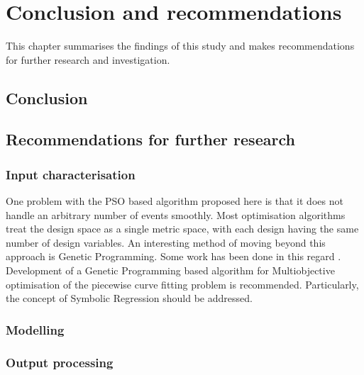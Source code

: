 \chapter{Conclusion and recommendations}\label{chap:conclusion}
\begin{overview}
  This chapter summarises the findings of this study and makes
  recommendations for further research and investigation.
\end{overview}

\section{Conclusion}

\section{Recommendations for further research}
\label{sec:furtherresearch}
\subsection{Input characterisation}
One problem with the PSO based algorithm proposed here is that it does not handle an arbitrary number of events smoothly.  Most optimisation algorithms treat the design space as a single metric space, with each design having the same number of design variables.  An interesting method of moving beyond this approach is Genetic Programming.  Some work has been done in this regard \citehere.  Development of a Genetic Programming based algorithm for Multiobjective optimisation of the piecewise curve fitting problem is recommended.  Particularly, the concept of Symbolic Regression should be addressed.

\subsection{Modelling}

\subsection{Output processing}

